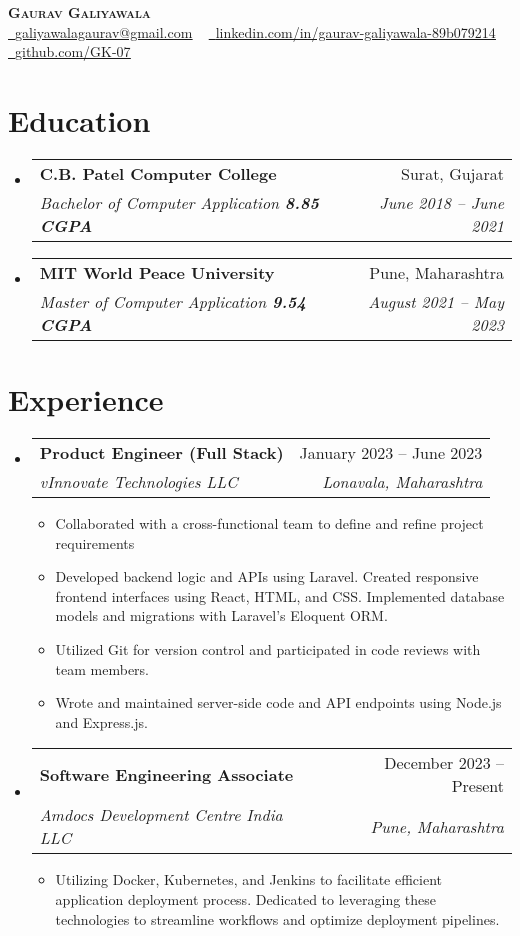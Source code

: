 \documentclass[letterpaper,11pt]{article}
\makeatletter
\newcommand{\resumeItem}[1]{
  \item\small{
    {#1 \vspace{-4pt}}
  }
}
\newcommand{\resumeSubheading}[4]{
  \vspace{-2pt}\item
    \begin{tabular*}{0.97\textwidth}[t]{l@{\extracolsep{\fill}}r}
      \textbf{#1} & #2 \\
      \textit{\small#3} & \textit{\small #4} \\
    \end{tabular*}\vspace{-7pt}
}
\newcommand{\resumeSubHeadingListStart}{\begin{itemize}[leftmargin=0.05in, label={}]}
\newcommand{\resumeSubHeadingListEnd}{\end{itemize}}
\newcommand{\resumeItemListStart}{\begin{itemize}\vspace{2pt}}
\newcommand{\resumeItemListEnd}{\end{itemize}\vspace{-5pt}}
\makeatother
\begin{document}

\begin{center}
    \textbf{\Huge \scshape Gaurav Galiyawala} \\ \vspace{1pt}
    \href{mailto:x@gmail.com}{\raisebox{-0.2\height}\faEnvelope\  \underline{galiyawalagaurav@gmail.com}} ~ 
    \href{https://linkedin.com/in//}{\raisebox{-0.2\height}\faLinkedin\ \underline{linkedin.com/in/gaurav-galiyawala-89b079214}}  ~
    \href{https://github.com/}{\raisebox{-0.2\height}\faGithub\ \underline{github.com/GK-07}}
    \vspace{-8pt}
\end{center}


\section{Education}
  \resumeSubHeadingListStart
    \resumeSubheading
       {C.B. Patel Computer College}{Surat, Gujarat}
      {Bachelor of Computer Application  \textbf{8.85 CGPA}}{June 2018 -- June 2021}
    \resumeSubheading
       {MIT World Peace University}{Pune, Maharashtra}
      {Master of Computer Application  \textbf{9.54 CGPA}}{August 2021 -- May 2023}
  \resumeSubHeadingListEnd


\section{Experience}
  \resumeSubHeadingListStart

    \resumeSubheading
      {Product Engineer (Full Stack)}{January 2023 -- June 2023}
      {vInnovate Technologies LLC}{Lonavala, Maharashtra}
      \resumeItemListStart
        \resumeItem{Collaborated with a cross-functional team to define and refine project requirements}
        \resumeItem{Developed backend logic and APIs using Laravel. Created responsive frontend interfaces using React, HTML, and CSS. Implemented database models and migrations with Laravel's Eloquent ORM.}
        \resumeItem{ Utilized Git for version control and participated in code reviews with team members.}
         \resumeItem{Wrote and maintained server-side code and API endpoints using Node.js and Express.js.}
      \resumeItemListEnd
      \resumeSubheading
      {Software Engineering Associate}{December 2023 -- Present}
      {Amdocs Development Centre India LLC}{Pune, Maharashtra}
      \resumeItemListStart
        \resumeItem{Utilizing Docker, Kubernetes, and Jenkins to facilitate efficient application deployment process. Dedicated to leveraging these technologies to streamline workflows and optimize deployment pipelines.}
      \resumeItemListEnd
    \resumeSubHeadingListEnd
      
\end{document}
